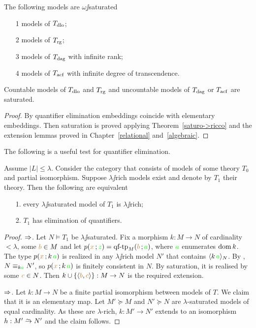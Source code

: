 \documentclass[creche.tex]{subfiles}
\begin{document}
\begin{corollary}
The following models are $\omega\jj$saturated
\begin{itemize}
\item[1] models of $T_{\rm dlo}$;
\item[2] models of $T_{\rm rg}$;
\item[3] models of $T_{\rm dag}$ with infinite rank;
\item[4] models of $T_{\rm acf}$ with infinite degree of transcendence.
\end{itemize}
Countable models of $T_{\rm dlo}$ and $T_{\rm rg}$ and uncountable models of $T_{\rm dag}$ or $T_{\rm acf}$ are saturated. 
\end{corollary}
\begin{proof}
By quantifier elimination embeddings coincide with elementary embeddings. Then saturation is proved applying Theorem~\ref{saturo->ricco} and the extension lemmas proved in Chapter~\ref{relational} and~\ref{algebraic}.
\end{proof}

The following is a useful test for quantifier elimination.

\begin{theorem}\label{thm_ricchezza_saturazione_QE}
Assume $|L|\le\lambda$. Consider the category that consists of models of some theory $T_0$ and partial isomorphism. Suppose $\lambda\jj$rich models exist and denote by $T_1$ their theory. Then the following are equivalent
\begin{itemize}
\item[1.] every $\lambda\jj$saturated model of $T_1$ is $\lambda\jj$rich;
\item[2.] $T_1$ has elimination of quantifiers.
\end{itemize}
\end{theorem}

\begin{proof}$\Rightarrow$. Let $N\models T_1$ be $\lambda\jj$saturated. Fix a morphism $k:M\to N$ of cardinality $<\lambda$, some ${\color{brown} b}\in M$ and let $p({\color{brown} x}\,;{\color{green} z})=\textrm{qf\mbox{-}tp}_M({\color{brown} b}\,;{\color{green} a})$, where ${\color{green} a}$ enumerates $\mathop{\rm dom} k$. The type $p({\color{brown} x}\,;k\,{\color{green} a})$ is realized in any $\lambda\jj$rich model $N'$ that contains $\langle k\,{\color{green} a}\rangle_N$. By , $N\equiv_{k{\color{green} a}} N'$, so $p({\color{brown} x}\,;k\,{\color{green} a})$ is finitely consistent in $N$.  By saturation, it is realised by some ${\color{brown} c}\in N$. Then $k\cup \{\langle{\color{brown}b},{\color{brown} c}\rangle\}:M\to N$ is the required extension.


$\Rightarrow$. Let $k:M\to N$ be a finite partial isomorphism between models of $T$. We claim that it is an elementary map. Let $M'\succeq M$ and $N'\succeq N$ are $\lambda$-saturated models of equal cardinality. As these are $\lambda$-rich, $k:M'\to N'$ extends to an isomorphism $h:M'\isomap N'$ and the claim follows.
\end{proof}
\end{document}
